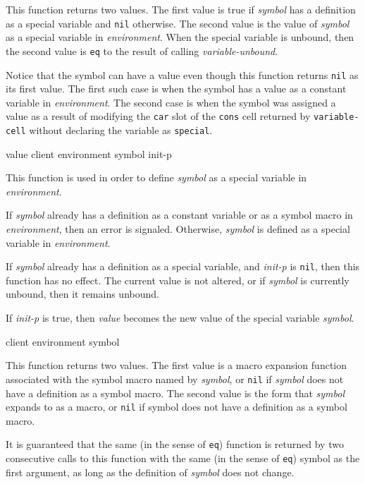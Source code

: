 This function returns two values. The first value is true if
\textit{symbol} has a definition as a special variable and
\texttt{nil} otherwise. The second value is the value of
\textit{symbol} as a special variable in \textit{environment}. When
the special variable is unbound, then the second value is \texttt{eq}
to the result of calling \textit{variable-unbound}.

Notice that the symbol can have a value even though this function
returns \texttt{nil} as its first value.  The first such case is when
the symbol has a value as a constant variable in \textit{environment}.
The second case is when the symbol was assigned a value as a result of
modifying the \texttt{car} slot of the \texttt{cons} cell returned by
\texttt{variable-cell} without declaring the variable as
\texttt{special}.

 {value client environment symbol init-p}

This function is used in order to define \textit{symbol} as a special
variable in \textit{environment}.

If \textit{symbol} already has a definition as a constant variable or
as a symbol macro in \textit{environment}, then an error is signaled.
Otherwise, \textit{symbol} is defined as a special variable in
\textit{environment}.

If \textit{symbol} already has a definition as a special variable, and
\textit{init-p} is \texttt{nil}, then this function has no effect.
The current value is not altered, or if \textit{symbol} is currently
unbound, then it remains unbound.

If \textit{init-p} is true, then \textit{value} becomes the new value
of the special variable \textit{symbol}.

 {client environment symbol}

This function returns two values.  The first value is a macro
expansion function associated with the symbol macro named by
\textit{symbol}, or \texttt{nil} if \textit{symbol} does not have a
definition as a symbol macro.  The second value is the form that
\textit{symbol} expands to as a macro, or \texttt{nil} if symbol does
not have a definition as a symbol macro.

It is guaranteed that the same (in the sense of \texttt{eq}) function
is returned by two consecutive calls to this function with the same
(in the sense of \texttt{eq})
symbol as the first argument, as long as the definition of
\textit{symbol} does not change.

